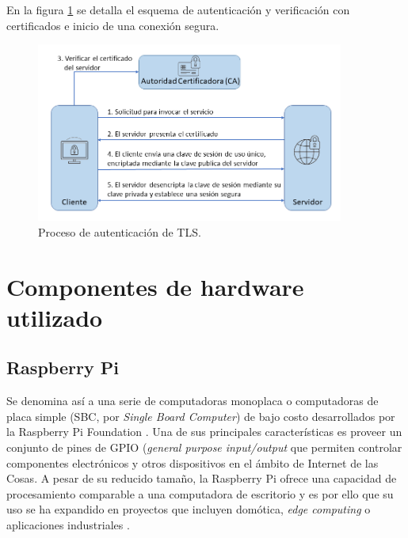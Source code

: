En la figura \ref{fig:ssl2way} se detalla el esquema de autenticación y verificación con certificados e inicio de una conexión segura.

\begin{figure}[h]
	\centering
	\includegraphics[width=0.9\textwidth]{./Figures/tls.png}
	\caption[Proceso de autenticación de TLS]{Proceso de autenticación de TLS\protect\footnotemark.}
	\label{fig:ssl2way}

\end{figure}
	
\section{Componentes de hardware utilizado}
\label{sec:Hardware utilizado}

\subsection{Raspberry Pi}
\label{sec:Raspberry Pi}
Se denomina así a una serie de computadoras monoplaca o computadoras de placa simple (SBC, por \textit{Single Board Computer}) de bajo costo desarrollados por la Raspberry Pi Foundation \citep{raspberrypi:1}.
Una de sus principales características es proveer un conjunto de pines de GPIO (\textit{general purpose input/output} que permiten controlar componentes electrónicos y otros dispositivos en el ámbito de Internet de las Cosas.
A pesar de su reducido tamaño, la Raspberry Pi ofrece una capacidad de procesamiento comparable a una computadora de escritorio y es por ello que su uso se ha expandido en proyectos que incluyen domótica, \textit{edge computing} o aplicaciones industriales \citep{raspberrypi:2}. 

